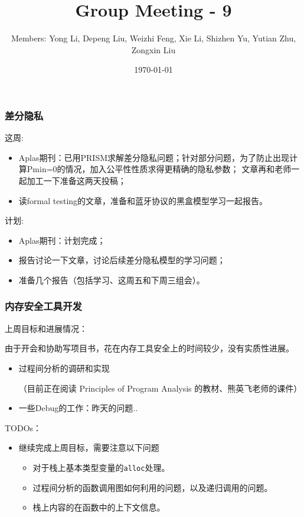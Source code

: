 \documentclass[aspectratio=1610, 13pt]{beamer}
\title{Group Meeting - 9}
\date{\today}
\author{Members: Yong Li, Depeng Liu, Weizhi Feng, Xie Li, Shizhen Yu, Yutian Zhu, Zongxin Liu}
\begin{document}
\maketitle

\begin{frame}\frametitle{差分隐私}
这周:
\begin{itemize}
  \item Aplas期刊：已用PRISM求解差分隐私问题；针对部分问题，为了防止出现计算Pmin=0的情况，加入公平性性质求得更精确的隐私参数；
  文章再和老师一起加工一下准备这两天投稿；
  \item 读formal testing的文章，准备和蓝牙协议的黑盒模型学习一起报告。
\end{itemize}

计划:
\begin{itemize}
  \item Aplas期刊：计划完成；
  \item 报告讨论一下文章，讨论后续差分隐私模型的学习问题；
  \item 准备几个报告（包括学习、这周五和下周三组会）。
\end{itemize}
\end{frame}

\begin{frame}\frametitle{内存安全工具开发}

上周目标和进展情况：

由于开会和协助写项目书，花在内存工具安全上的时间较少，没有实质性进展。
\begin{itemize}

\item 过程间分析的调研和实现

（目前正在阅读 Principles of Program Analysis 的教材、熊英飞老师的课件）

\item 一些Debug的工作：昨天的问题..
\end{itemize}
TODOs：
\begin{itemize}

\item 继续完成上周目标，需要注意以下问题
\begin{itemize}
\item 对于栈上基本类型变量的\texttt{alloc}处理。
\item 过程间分析的函数调用图如何利用的问题，以及递归调用的问题。
\item 栈上内容的在函数中的上下文信息。
\end{itemize}
\end{itemize}

 \end{frame}
 
\end{document}
